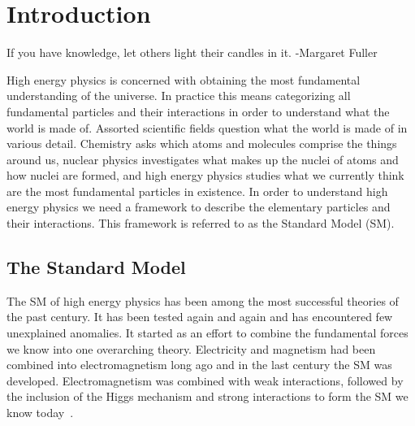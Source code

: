 \chapter{Introduction}
\label{SECTION-INTRO}

If you have knowledge, let others light their candles in it. -Margaret Fuller

\vspace{5mm} %

High energy physics is concerned with obtaining the most fundamental understanding of the universe. In practice this means categorizing all fundamental particles and their interactions in order to understand what the world is made of. Assorted scientific fields question what the world is made of in various detail. Chemistry asks which atoms and molecules comprise the things around us, nuclear physics investigates what makes up the nuclei of atoms and how nuclei are formed, and high energy physics studies what we currently think are the most fundamental particles in existence. In order to understand high energy physics we need a framework to describe the elementary particles and their interactions. This framework is referred to as the Standard Model (SM). 


\section{The Standard Model}
\label{SECTION-THEORY-SM}

The SM of high energy physics has been among the most successful theories of the past century. It has been tested again and again and has encountered few unexplained anomalies. It started as an effort to combine the fundamental forces we know into one overarching theory. Electricity and magnetism had been combined into electromagnetism long ago and in the last century the SM was developed. Electromagnetism was combined with weak interactions, followed by the inclusion of the Higgs mechanism and strong interactions to form the SM we know today~\cite{Griffiths,QFT-PS,QFT-IZ}. 


